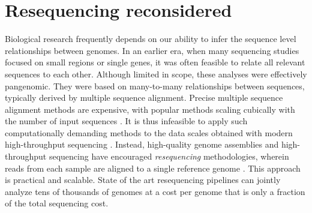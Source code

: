 



\section{Resequencing reconsidered}
\label{sec:resequencing}


Biological research frequently depends on our ability to infer the sequence level relationships between genomes.
In an earlier era, when many sequencing studies focused on small regions or single genes, it was often feasible to relate all relevant sequences to each other.
Although limited in scope, these analyses were effectively pangenomic.
They were based on many-to-many relationships between sequences, typically derived by multiple sequence alignment.
Precise multiple sequence alignment methods are expensive, with popular methods scaling cubically with the number of input sequences \cite{notredame2000t}.
It is thus infeasible to apply such computationally demanding methods to the data scales obtained with modern high-throughput sequencing \cite{schuster2008next}. %
Instead, high-quality genome assemblies and high-throughput sequencing have encouraged \emph{resequencing} methodologies, wherein reads from each sample are aligned to a single reference genome \cite{stratton2008genome}.
This approach is practical and scalable.
State of the art resequencing pipelines can jointly analyze tens of thousands of genomes \cite{Poplin_2017} at a cost per genome that is only a fraction of the total sequencing cost.

